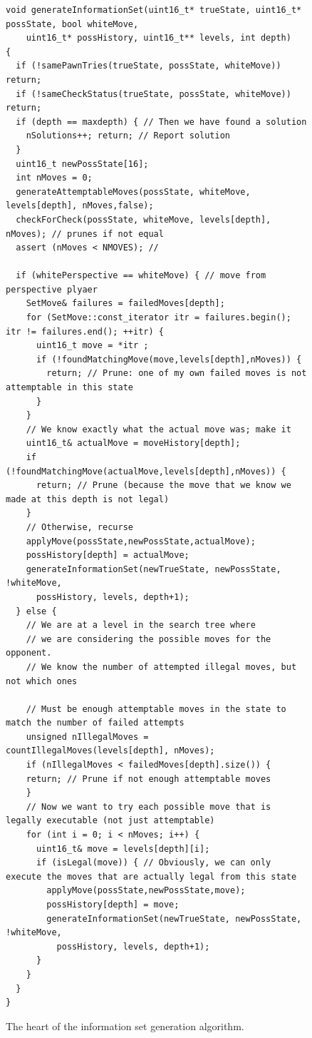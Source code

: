 \documentclass[11pt]{article}
\begin{document}
\begin{figure}
\begin{lstlisting}
void generateInformationSet(uint16_t* trueState, uint16_t* possState, bool whiteMove, 
	uint16_t* possHistory, uint16_t** levels, int depth)
{
  if (!samePawnTries(trueState, possState, whiteMove)) return;  
  if (!sameCheckStatus(trueState, possState, whiteMove)) return; 
  if (depth == maxdepth) { // Then we have found a solution
	nSolutions++; return; // Report solution
  }
  uint16_t newPossState[16]; 
  int nMoves = 0;
  generateAttemptableMoves(possState, whiteMove, levels[depth], nMoves,false);
  checkForCheck(possState, whiteMove, levels[depth], nMoves); // prunes if not equal
  assert (nMoves < NMOVES); // 

  if (whitePerspective == whiteMove) { // move from perspective plyaer 
    SetMove& failures = failedMoves[depth];
    for (SetMove::const_iterator itr = failures.begin(); itr != failures.end(); ++itr) {
      uint16_t move = *itr ;
      if (!foundMatchingMove(move,levels[depth],nMoves)) {
        return; // Prune: one of my own failed moves is not attemptable in this state
      }
    }
    // We know exactly what the actual move was; make it
    uint16_t& actualMove = moveHistory[depth];
    if (!foundMatchingMove(actualMove,levels[depth],nMoves)) {
      return; // Prune (because the move that we know we made at this depth is not legal)
    }
    // Otherwise, recurse 
    applyMove(possState,newPossState,actualMove);
    possHistory[depth] = actualMove;
    generateInformationSet(newTrueState, newPossState, !whiteMove, 
      possHistory, levels, depth+1);
  } else { 
    // We are at a level in the search tree where 
    // we are considering the possible moves for the opponent.
    // We know the number of attempted illegal moves, but not which ones

    // Must be enough attemptable moves in the state to match the number of failed attempts
    unsigned nIllegalMoves = countIllegalMoves(levels[depth], nMoves);
    if (nIllegalMoves < failedMoves[depth].size()) {
	return; // Prune if not enough attemptable moves
    }
    // Now we want to try each possible move that is legally executable (not just attemptable) 
    for (int i = 0; i < nMoves; i++) {
      uint16_t& move = levels[depth][i];
      if (isLegal(move)) { // Obviously, we can only execute the moves that are actually legal from this state
        applyMove(possState,newPossState,move);
        possHistory[depth] = move;
        generateInformationSet(newTrueState, newPossState, !whiteMove, 
          possHistory, levels, depth+1);
      }
    }
  }
}
\end{lstlisting}
\caption{The heart of the information set generation algorithm.}
\label{codelisting}
\end{figure}
\end{document}
